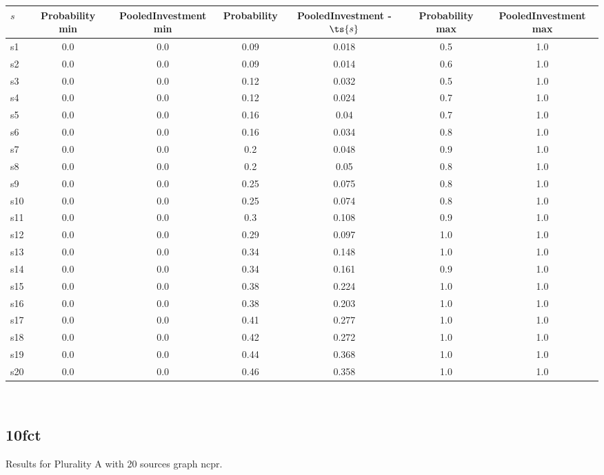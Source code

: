 \documentclass{article}
\begin{document}
\noindent\begin{tabular}{|l|c|c|c|c|c|c|}
\hline
$s$& Probability min & PooledInvestment min & Probability & PooledInvestment - $\ts{s}$ & Probability max & PooledInvestment max\\
\hline
s1 &0.0 & 0.0 & 0.09 & 0.018 & 0.5 & 1.0\\
\hline
s2 &0.0 & 0.0 & 0.09 & 0.014 & 0.6 & 1.0\\
\hline
s3 &0.0 & 0.0 & 0.12 & 0.032 & 0.5 & 1.0\\
\hline
s4 &0.0 & 0.0 & 0.12 & 0.024 & 0.7 & 1.0\\
\hline
s5 &0.0 & 0.0 & 0.16 & 0.04 & 0.7 & 1.0\\
\hline
s6 &0.0 & 0.0 & 0.16 & 0.034 & 0.8 & 1.0\\
\hline
s7 &0.0 & 0.0 & 0.2 & 0.048 & 0.9 & 1.0\\
\hline
s8 &0.0 & 0.0 & 0.2 & 0.05 & 0.8 & 1.0\\
\hline
s9 &0.0 & 0.0 & 0.25 & 0.075 & 0.8 & 1.0\\
\hline
s10 &0.0 & 0.0 & 0.25 & 0.074 & 0.8 & 1.0\\
\hline
s11 &0.0 & 0.0 & 0.3 & 0.108 & 0.9 & 1.0\\
\hline
s12 &0.0 & 0.0 & 0.29 & 0.097 & 1.0 & 1.0\\
\hline
s13 &0.0 & 0.0 & 0.34 & 0.148 & 1.0 & 1.0\\
\hline
s14 &0.0 & 0.0 & 0.34 & 0.161 & 0.9 & 1.0\\
\hline
s15 &0.0 & 0.0 & 0.38 & 0.224 & 1.0 & 1.0\\
\hline
s16 &0.0 & 0.0 & 0.38 & 0.203 & 1.0 & 1.0\\
\hline
s17 &0.0 & 0.0 & 0.41 & 0.277 & 1.0 & 1.0\\
\hline
s18 &0.0 & 0.0 & 0.42 & 0.272 & 1.0 & 1.0\\
\hline
s19 &0.0 & 0.0 & 0.44 & 0.368 & 1.0 & 1.0\\
\hline
s20 &0.0 & 0.0 & 0.46 & 0.358 & 1.0 & 1.0\\
\hline
\end{tabular}\\

\newpage

\subsection{10fct}

\noindent Results for Plurality A with 20 sources graph ncpr.
\end{document}
